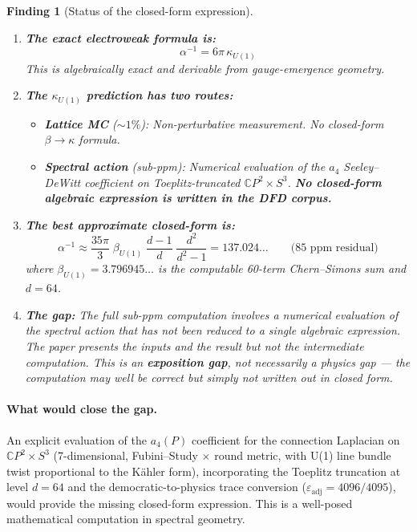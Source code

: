 \documentclass[12pt,a4paper]{article}
\newtheorem{finding}{Finding}
\theoremstyle{definition}
\begin{document}
\begin{finding}[Status of the closed-form expression]
\mbox{}
\begin{enumerate}
\item \textbf{The exact electroweak formula is:}
\begin{equation}
\alpha^{-1} = 6\pi\,\kappa_{U(1)}
\end{equation}
This is algebraically exact and derivable from gauge-emergence geometry.

\item \textbf{The $\kappa_{U(1)}$ prediction has two routes:}
\begin{itemize}
\item \textbf{Lattice MC} ($\sim 1\%$): Non-perturbative measurement.
  No closed-form $\beta \to \kappa$ formula.
\item \textbf{Spectral action} (sub-ppm): Numerical evaluation of the
  $a_4$ Seeley--DeWitt coefficient on Toeplitz-truncated
  $\mathbb{C}P^2 \times S^3$.  \textbf{No closed-form algebraic
  expression is written in the DFD corpus.}
\end{itemize}

\item \textbf{The best approximate closed-form is:}
\begin{equation}
\alpha^{-1} \approx \frac{35\pi}{3}\;\beta_{U(1)}\;\frac{d{-}1}{d}
\;\frac{d^2}{d^2{-}1}
= 137.024\ldots
\qquad \text{(85~ppm residual)}
\end{equation}
where $\beta_{U(1)} = 3.796945\ldots$ is the computable 60-term
Chern--Simons sum and $d = 64$.

\item \textbf{The gap:} The full sub-ppm computation
involves a numerical evaluation of the spectral action that has not been
reduced to a single algebraic expression. The paper presents the
\emph{inputs} and the \emph{result} but not the intermediate
computation. This is an \textbf{exposition gap}, not necessarily a
physics gap --- the computation may well be correct but simply not
written out in closed form.
\end{enumerate}
\end{finding}

\paragraph{What would close the gap.}
An explicit evaluation of the $a_4(P)$ coefficient for the connection
Laplacian on $\mathbb{C}P^2 \times S^3$ (7-dimensional, Fubini--Study
$\times$ round metric, with U(1) line bundle twist proportional to the
K\"ahler form), incorporating the Toeplitz truncation at level $d = 64$
and the democratic-to-physics trace conversion
($\varepsilon_{\mathrm{adj}} = 4096/4095$), would provide the missing
closed-form expression. This is a well-posed mathematical computation
in spectral geometry.
\end{document}
